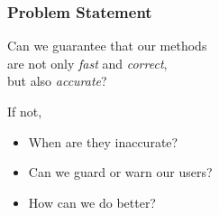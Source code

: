 \begin{frame}

\frametitle{Problem Statement}

\vspace{\fill}

\begin{flushright}

Can we guarantee that our methods \\ are not only \emph{fast} and
\emph{correct}, \\ but also \emph{accurate}?

\end{flushright}

\vspace{\fill}

If not,

\begin{itemize}

\item When are they inaccurate?

\item Can we guard or warn our users?

\item How can we do better?

\end{itemize}

\vspace{\fill}

\end{frame}
